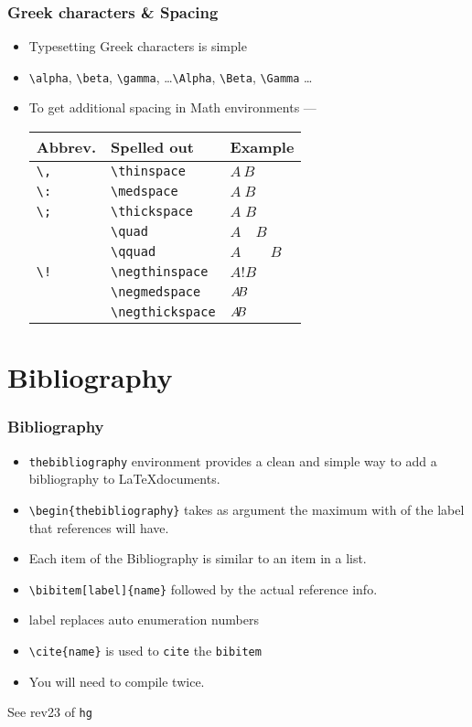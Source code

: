 \documentclass{beamer}
\newcommand{\typ}[1]{\lstinline{#1}}
\begin{document}
\begin{frame}[fragile]
  \frametitle{Greek characters \& Spacing}
  \begin{itemize}
  \item Typesetting Greek characters is simple
  \item \lstinline+\alpha+, \lstinline+\beta+, \lstinline+\gamma+,
    \ldots \lstinline+\Alpha+, \lstinline+\Beta+, \lstinline+\Gamma+
    \ldots 
  \item To get additional spacing in Math environments ---
\begin{center}
\begin{tabular}{|l|l|l|}
\hline
 Abbrev. & Spelled out & Example  \\
\hline
 \lstinline+\,+ & \lstinline+\thinspace+ & $A\,B$ \\
\hline
 \lstinline+\:+ & \lstinline+\medspace+ & $A\:B$ \\
\hline
 \lstinline+\;+ & \lstinline+\thickspace+ & $A\;B$ \\
\hline
   & \lstinline+\quad+ & $A \quad B$ \\
\hline
   & \lstinline+\qquad+ & $A \qquad B$ \\
\hline
 \lstinline+\!+ & \lstinline+\negthinspace+ & $A!B$ \\
\hline
   & \lstinline+\negmedspace+ & $A \negmedspace B$ \\
\hline
   & \lstinline+\negthickspace+ & $A \negthickspace B$ \\
\hline

\end{tabular}
\end{center}
  \end{itemize}
\end{frame}

\section{Bibliography}
\begin{frame}[fragile]
  \frametitle{Bibliography}
  \begin{itemize}
  \item \lstinline+thebibliography+ environment provides a clean and
    simple way to add a bibliography to \LaTeX documents. 
  \item \lstinline+\begin{thebibliography}+ takes as argument the
    maximum with of the label that references will have. 
  \item Each item of the Bibliography is similar to an item in a
    list. 
  \item \lstinline+\bibitem[label]{name}+ followed by the actual
    reference info. 
  \item label replaces auto enumeration numbers 
  \item \lstinline+\cite{name}+ is used to \lstinline+cite+ the
    \lstinline+bibitem+ 
  \item You will need to compile twice. 
  \end{itemize}
  \tiny See rev23 of \typ{hg}    
\end{frame}
\end{document}
